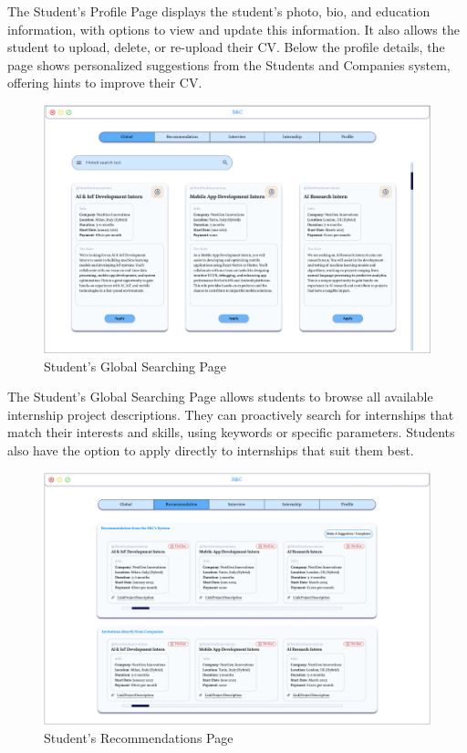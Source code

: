 The Student's Profile Page displays the student's photo, bio, and education information, with options to view and update this information. It also allows the student to upload, delete, or re-upload their CV. Below the profile details, the page shows personalized suggestions from the Students and Companies system, offering hints to improve their CV.


\begin{figure}[H]
    \centering
    \includegraphics[width=1\linewidth]{DD//Images/UI photos/Student's Global.png}
    \caption{Student's Global Searching Page}
\end{figure}

The Student's Global Searching Page allows students to browse all available internship project descriptions. They can proactively search for internships that match their interests and skills, using keywords or specific parameters. Students also have the option to apply directly to internships that suit them best.

\begin{figure}[H]
    \centering
    \includegraphics[width=1\linewidth]{DD//Images/UI photos/Student's Recommendations.png}
    \caption{Student's Recommendations Page}
\end{figure}

